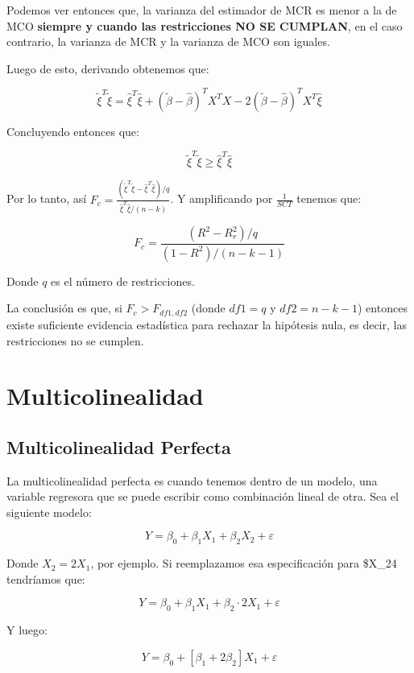 \documentclass[
]{book}
\begin{document}
Podemos ver entonces que, la varianza del estimador de MCR es menor a la de MCO \textbf{siempre y cuando las restricciones NO SE CUMPLAN}, en el caso contrario, la varianza de MCR y la varianza de MCO son iguales.

Luego de esto, derivando obtenemos que:

\[
\widetilde{\xi}^T\widetilde{\xi} = \widehat{\xi}^T\widehat{\xi} + (\widetilde{\beta} - \widehat{\beta})^TX^TX- 2(\widetilde{\beta} - \widehat{\beta})^TX^T\widehat{\xi}
\]

Concluyendo entonces que:

\[
\widetilde{\xi}^T\widetilde{\xi} \ge \widehat{\xi}^T\widehat{\xi}
\]

Por lo tanto, así \(F_c = \frac{(\widetilde{\xi}^T\widetilde{\xi} - \widehat{\xi}^T\widehat{\xi})/q}{\widehat{\xi}^T\widehat{\xi}/(n-k)}\). Y amplificando por \(\frac{1}{SCT}\) tenemos que:

\[
F_c = \frac{(R^2 - R^2_{r})/q}{(1-R^2)/(n-k-1)}
\]

Donde \(q\) es el número de restricciones.

La conclusión es que, si \(F_c > F_{df1,df2}\) (donde \(df1 = q\) y \(df2 = n-k-1\)) entonces existe suficiente evidencia estadística para rechazar la hipótesis nula, es decir, las restricciones no se cumplen.

\chapter{Multicolinealidad}\label{multicolinealidad}

\section{Multicolinealidad Perfecta}\label{multicolinealidad-perfecta}

La multicolinealidad perfecta es cuando tenemos dentro de un modelo, una variable regresora que se puede escribir como combinación lineal de otra. Sea el siguiente modelo:

\[Y = \beta_0 + \beta_1X_1 + \beta_2X_2 + \varepsilon\]

Donde \(X_2 = 2X_1\), por ejemplo. Si reemplazamos esa especificación para \$X\_24 tendríamos que:

\[Y = \beta_0 + \beta_1X_1 + \beta_2 \cdot 2X_1 + \varepsilon\]

Y luego:

\[Y = \beta_0 + [\beta_1 + 2\beta_2]X_1 + \varepsilon\]
\end{document}
